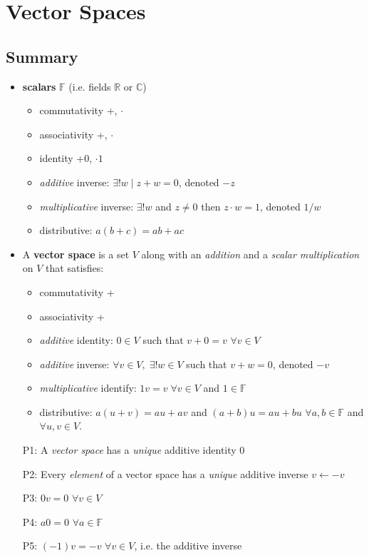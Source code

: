 %
%


\section{Vector Spaces}
\subsection*{Summary}
\begin{itemize}
\item \textbf{scalars} $\mathbb{F}$ (i.e. fields $\mathbb{R}$ or $\mathbb{C}$)
\begin{itemize}
\item commutativity +, $\cdot$
\item associativity +, $\cdot$
\item identity +0, $\cdot 1$
\item \emph{additive} inverse: $\exists!w \mid z + w = 0$, denoted $-z$
\item \emph{multiplicative} inverse: $\exists!w$ and $z\neq0$ then $z\cdot w = 1$, denoted $1/w$
\item distributive: $a(b+c) = ab+ac$
\end{itemize}
\item A \textbf{vector space} is a set $V$ along with an \emph{addition}  and a \emph{scalar multiplication} on $V$ that satisfies:
\begin{itemize}
\item commutativity +
\item associativity +
\item \emph{additive} identity: $0\in V$ such that $v+0=v$ $\forall v\in V$
\item \emph{additive} inverse: $\forall v\in V,\; \exists!w\in V$ such that $v+w=0$, denoted $-v$
\item \emph{multiplicative} identify: $1v=v\;\forall v\in V$ and $1\in\mathbb{F}$
\item distributive: $a(u+v)=au+av$ and $(a+b)u=au+bu$ $\forall a,b\in\mathbb{F}$ and $\forall u,v \in V$.
\end{itemize}
 
\item[P1:\label{it:P1_1}] A \emph{vector space} has a \emph{unique} additive identity $0$
\item[P2:\label{it:P1_2}] Every \emph{element} of a vector space has a \emph{unique} additive inverse $v\leftarrow -v$
\item[P3:] $0v=0$ $\forall v\in V$
\item[P4:] $a0=0$ $\forall a\in \mathbb{F}$
\item[P5:] $(-1)v = -v$ $\forall v\in V$, i.e. the additive inverse


\end{itemize}
